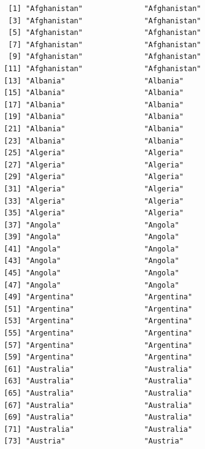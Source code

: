 \documentclass[
  letterpaper,
  DIV=11,
  numbers=noendperiod]{scrreprt}
\newenvironment{Shaded}{\begin{snugshade}}{\end{snugshade}}
\newcommand{\NormalTok}[1]{\textcolor[rgb]{0.00,0.23,0.31}{#1}}
\newcommand{\SpecialCharTok}[1]{\textcolor[rgb]{0.37,0.37,0.37}{#1}}
\begin{document}
\begin{Shaded}
\end{Shaded}

\begin{verbatim}
   [1] "Afghanistan"              "Afghanistan"             
   [3] "Afghanistan"              "Afghanistan"             
   [5] "Afghanistan"              "Afghanistan"             
   [7] "Afghanistan"              "Afghanistan"             
   [9] "Afghanistan"              "Afghanistan"             
  [11] "Afghanistan"              "Afghanistan"             
  [13] "Albania"                  "Albania"                 
  [15] "Albania"                  "Albania"                 
  [17] "Albania"                  "Albania"                 
  [19] "Albania"                  "Albania"                 
  [21] "Albania"                  "Albania"                 
  [23] "Albania"                  "Albania"                 
  [25] "Algeria"                  "Algeria"                 
  [27] "Algeria"                  "Algeria"                 
  [29] "Algeria"                  "Algeria"                 
  [31] "Algeria"                  "Algeria"                 
  [33] "Algeria"                  "Algeria"                 
  [35] "Algeria"                  "Algeria"                 
  [37] "Angola"                   "Angola"                  
  [39] "Angola"                   "Angola"                  
  [41] "Angola"                   "Angola"                  
  [43] "Angola"                   "Angola"                  
  [45] "Angola"                   "Angola"                  
  [47] "Angola"                   "Angola"                  
  [49] "Argentina"                "Argentina"               
  [51] "Argentina"                "Argentina"               
  [53] "Argentina"                "Argentina"               
  [55] "Argentina"                "Argentina"               
  [57] "Argentina"                "Argentina"               
  [59] "Argentina"                "Argentina"               
  [61] "Australia"                "Australia"               
  [63] "Australia"                "Australia"               
  [65] "Australia"                "Australia"               
  [67] "Australia"                "Australia"               
  [69] "Australia"                "Australia"               
  [71] "Australia"                "Australia"               
  [73] "Austria"                  "Austria"                 

\end{verbatim}
\end{document}
